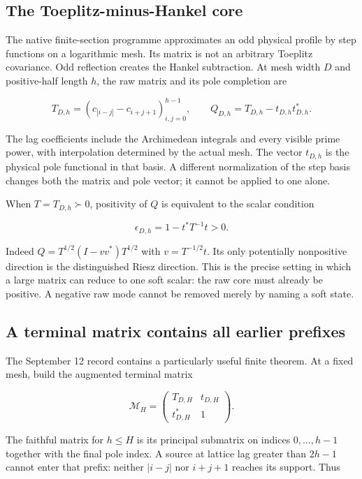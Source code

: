 \documentclass[
  10pt,
  a4paper,
  10pt,
  oneside,
  openany]{book}
\begin{document}
\subsection{The Toeplitz-minus-Hankel
core}\label{the-toeplitz-minus-hankel-core}

The native finite-section programme approximates an odd physical profile
by step functions on a logarithmic mesh. Its matrix is not an arbitrary
Toeplitz covariance. Odd reflection creates the Hankel subtraction. At
mesh width \(D\) and positive-half length \(h\), the raw matrix and its
pole completion are

\[
 T_{D,h}=(c_{|i-j|}-c_{i+j+1})_{i,j=0}^{h-1},
 \qquad Q_{D,h}=T_{D,h}-t_{D,h}t_{D,h}^{*}.
 \tag{39.1}\label{eq:39.1}
\]

The lag coefficients include the Archimedean integrals and every visible
prime power, with interpolation determined by the actual mesh. The
vector \(t_{D,h}\) is the physical pole functional in that basis. A
different normalization of the step basis changes both the matrix and
pole vector; it cannot be applied to one alone.

When \(T=T_{D,h}\succ0\), positivity of \(Q\) is equivalent to the
scalar condition

\[
 \epsilon_{D,h}=1-t^{*}T^{-1}t>0.
 \tag{39.2}\label{eq:39.2}
\]

Indeed \(Q=T^{1/2}(I-vv^{*})T^{1/2}\) with \(v=T^{-1/2}t\). Its only
potentially nonpositive direction is the distinguished Riesz direction.
This is the precise setting in which a large matrix can reduce to one
soft scalar: the raw core must already be positive. A negative raw mode
cannot be removed merely by naming a soft state.

\subsection{A terminal matrix contains all earlier
prefixes}\label{a-terminal-matrix-contains-all-earlier-prefixes}

The September 12 record contains a particularly useful finite theorem.
At a fixed mesh, build the augmented terminal matrix

\[
 \mathcal M_H=\begin{pmatrix}T_{D,H}&t_{D,H}\\t_{D,H}^{*}&1\end{pmatrix}.
\]

The faithful matrix for \(h\le H\) is its principal submatrix on indices
\(0,\ldots,h-1\) together with the final pole index. A source at lattice
lag greater than \(2h-1\) cannot enter that prefix: neither \(|i-j|\)
nor \(i+j+1\) reaches its support. Thus
\end{document}
